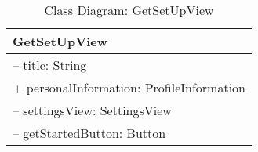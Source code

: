 \begin{table}[H]
\centering
\caption{Class Diagram: GetSetUpView}

\hspace{1em}
\renewcommand{\arraystretch}{1.7}

\begin{tabular}{|l|}
\hline
\textbf{GetSetUpView} \\
\hline
– title: String \\
+ personalInformation: ProfileInformation \\
– settingsView: SettingsView \\
– getStartedButton: Button \\
\hline
\end{tabular}
\end{table}
